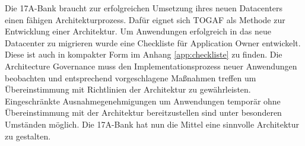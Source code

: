 Die 17A-Bank braucht zur erfolgreichen Umsetzung ihres neuen Datacenters einen fähigen Architekturprozess. Dafür eignet sich TOGAF als Methode zur Entwicklung einer Architektur. Um Anwendungen erfolgreich in das neue Datacenter zu migrieren wurde eine Checkliste für Application Owner entwickelt. Diese ist auch in kompakter Form im Anhang \ref{app:checkliste} zu finden. Die Architecture Governance muss den Implementationsprozess neuer Anwendungen beobachten und entsprechend vorgeschlagene Maßnahmen treffen um Übereinstimmung mit Richtlinien der Architektur zu gewährleisten. Eingeschränkte Ausnahmegenehmigungen um Anwendungen temporär ohne Übereinstimmung mit der Architektur bereitzustellen sind unter besonderen Umständen möglich. Die 17A-Bank hat nun die Mittel eine sinnvolle Architektur zu gestalten.